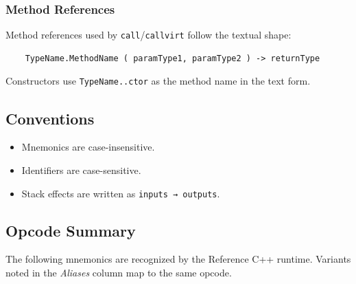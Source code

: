 \documentclass[11pt,a4paper]{article}
\begin{document}
	\subsubsection{Method References}
	Method references used by \texttt{call}/\texttt{callvirt} follow the textual shape:
	\begin{lstlisting}
	TypeName.MethodName ( paramType1, paramType2 ) -> returnType
	\end{lstlisting}
	Constructors use \texttt{TypeName..ctor} as the method name in the text form.
	
	
	\subsection{Conventions}
	\begin{itemize}
		\item Mnemonics are case-insensitive.
		\item Identifiers are case-sensitive.
		\item Stack effects are written as \texttt{inputs → outputs}.
	\end{itemize}
	
	\subsection{Opcode Summary}
	The following mnemonics are recognized by the Reference C++ runtime. Variants noted in the \emph{Aliases} column map to the same opcode.
	
\end{document}
